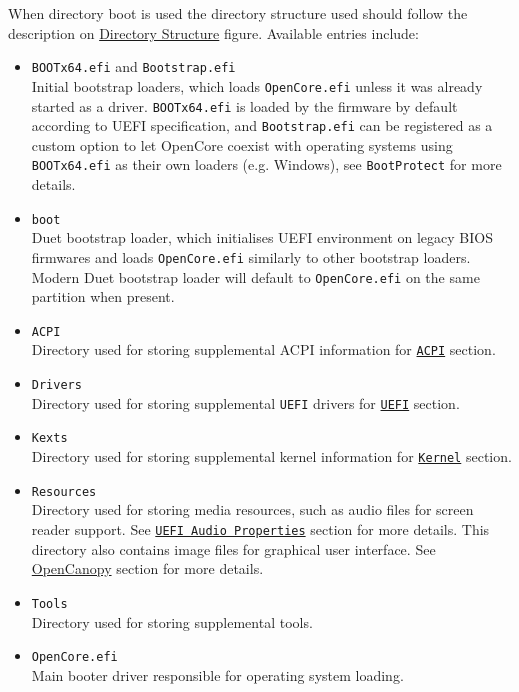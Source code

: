 \documentclass[]{article}
\providecommand{\tightlist}{%
  \setlength{\itemsep}{0pt}\setlength{\parskip}{0pt}}
\begin{document}
When directory boot is used the directory structure used should follow
the description on \hyperref[fig:DS]{Directory Structure} figure. Available
entries include:

\begin{itemize}
\tightlist
\item
  \texttt{BOOTx64.efi} and \texttt{Bootstrap.efi} \\
  Initial bootstrap loaders, which loads \texttt{OpenCore.efi} unless it was
  already started as a driver. \texttt{BOOTx64.efi} is loaded by the firmware
  by default according to UEFI specification, and \texttt{Bootstrap.efi} can
  be registered as a custom option to let OpenCore coexist with operating systems
  using \texttt{BOOTx64.efi} as their own loaders (e.g. Windows), see
  \texttt{BootProtect} for more details.
\item
  \texttt{boot} \\
  Duet bootstrap loader, which initialises UEFI environment on legacy BIOS firmwares
  and loads \texttt{OpenCore.efi} similarly to other bootstrap loaders. Modern Duet
  bootstrap loader will default to \texttt{OpenCore.efi} on the same partition when
  present.
\item
  \texttt{ACPI} \\
  Directory used for storing supplemental ACPI information
  for \hyperref[acpi]{\texttt{ACPI}} section.
\item
  \texttt{Drivers} \\
  Directory used for storing supplemental \texttt{UEFI}
  drivers for \hyperref[uefi]{\texttt{UEFI}} section.
\item
  \texttt{Kexts} \\
  Directory used for storing supplemental kernel information
  for \hyperref[kernel]{\texttt{Kernel}} section.
\item
  \texttt{Resources} \\
  Directory used for storing media resources, such as audio files
  for screen reader support. See \hyperref[uefiaudioprops]{\texttt{UEFI Audio Properties}}
  section for more details. This directory also contains image files
  for graphical user interface. See \hyperref[ueficanopy]{OpenCanopy} section for more details.
\item
  \texttt{Tools} \\
  Directory used for storing supplemental tools.
\item
  \texttt{OpenCore.efi} \\
  Main booter driver responsible for operating system loading.

\end{itemize}
\end{document}
